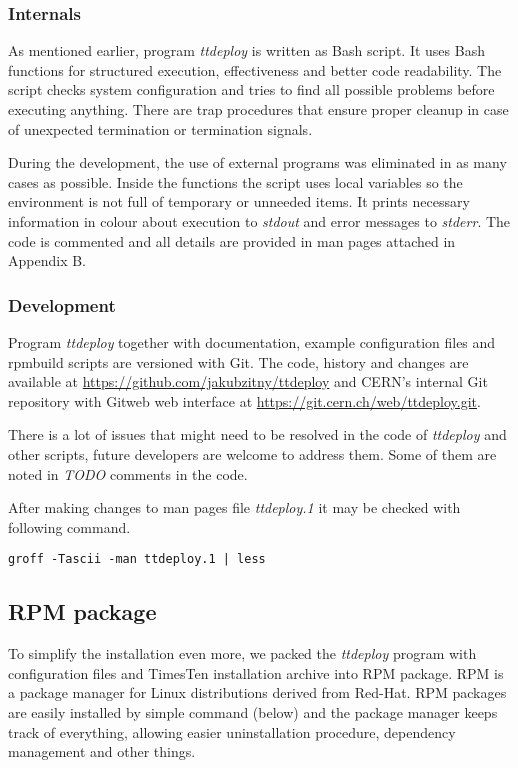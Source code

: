\documentclass[11pt, letterpaper]{article}
\begin{document}
\subsubsection{Internals}

As mentioned earlier, program \emph{ttdeploy} is written as Bash script. It uses Bash functions for structured execution, effectiveness and better code readability. The script checks system configuration and tries to find all possible problems before executing anything. There are trap procedures that ensure proper cleanup in case of unexpected termination or termination signals.

During the development, the use of external programs was eliminated in as many cases as possible. Inside the functions the script uses local variables so the environment is not full of temporary or unneeded items. It prints necessary information in colour about execution to \emph{stdout} and error messages to \emph{stderr}. The code is commented and all details are provided in man pages attached in Appendix B.

\subsubsection{Development}

Program \emph{ttdeploy} together with documentation, example configuration files and rpmbuild scripts are versioned with Git. The code, history and changes are available at \url{https://github.com/jakubzitny/ttdeploy} and CERN's internal Git repository with Gitweb web interface at \url{https://git.cern.ch/web/ttdeploy.git}.

There is a lot of issues that might need to be resolved in the code of \emph{ttdeploy} and other scripts, future developers are welcome to address them. Some of them are noted in \emph{TODO} comments in the code.

After making changes to man pages file \emph{ttdeploy.1} it may be checked with following command.

\begin{lstlisting}
groff -Tascii -man ttdeploy.1 | less
\end{lstlisting}

\subsection{RPM package}
To simplify the installation even more, we packed the \emph{ttdeploy} program with configuration files and TimesTen installation archive into RPM package. RPM is a package manager for Linux distributions derived from Red-Hat. RPM packages are easily installed by simple command (below) and the package manager keeps track of everything, allowing easier uninstallation procedure, dependency management and other things.
\end{document}
